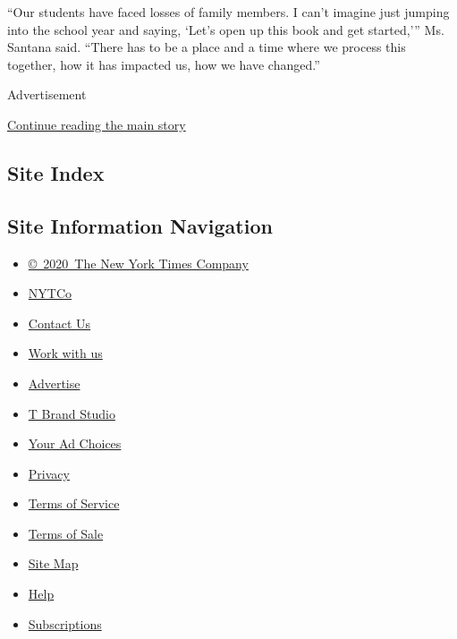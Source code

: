 ``Our students have faced losses of family members. I can't imagine just
jumping into the school year and saying, `Let's open up this book and
get started,''' Ms. Santana said. ``There has to be a place and a time
where we process this together, how it has impacted us, how we have
changed.''

Advertisement

\protect\hyperlink{after-bottom}{Continue reading the main story}

\hypertarget{site-index}{%
\subsection{Site Index}\label{site-index}}

\hypertarget{site-information-navigation}{%
\subsection{Site Information
Navigation}\label{site-information-navigation}}

\begin{itemize}
\tightlist
\item
  \href{https://help.nytimes3xbfgragh.onion/hc/en-us/articles/115014792127-Copyright-notice}{©~2020~The
  New York Times Company}
\end{itemize}

\begin{itemize}
\tightlist
\item
  \href{https://www.nytco.com/}{NYTCo}
\item
  \href{https://help.nytimes3xbfgragh.onion/hc/en-us/articles/115015385887-Contact-Us}{Contact
  Us}
\item
  \href{https://www.nytco.com/careers/}{Work with us}
\item
  \href{https://nytmediakit.com/}{Advertise}
\item
  \href{http://www.tbrandstudio.com/}{T Brand Studio}
\item
  \href{https://www.nytimes3xbfgragh.onion/privacy/cookie-policy\#how-do-i-manage-trackers}{Your
  Ad Choices}
\item
  \href{https://www.nytimes3xbfgragh.onion/privacy}{Privacy}
\item
  \href{https://help.nytimes3xbfgragh.onion/hc/en-us/articles/115014893428-Terms-of-service}{Terms
  of Service}
\item
  \href{https://help.nytimes3xbfgragh.onion/hc/en-us/articles/115014893968-Terms-of-sale}{Terms
  of Sale}
\item
  \href{https://spiderbites.nytimes3xbfgragh.onion}{Site Map}
\item
  \href{https://help.nytimes3xbfgragh.onion/hc/en-us}{Help}
\item
  \href{https://www.nytimes3xbfgragh.onion/subscription?campaignId=37WXW}{Subscriptions}
\end{itemize}
